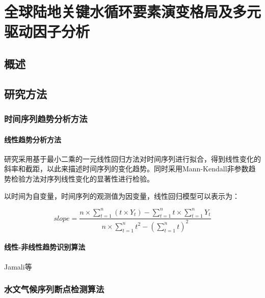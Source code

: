 \chapter{全球陆地关键水循环要素演变格局及多元驱动因子分析}
\label{chap:runoff_trend}

\section{概述}

\section{研究方法}

\subsection{时间序列趋势分析方法}

\subsubsection{线性趋势分析方法}

研究采用基于最小二乘的一元线性回归方法对时间序列进行拟合，得到线性变化的斜率和截距，以此来描述时间序列的变化趋势。同时采用Mann-Kendall非参数趋势检验方法对序列线性变化的显著性进行检验。\par
以时间为自变量，时间序列的观测值为因变量，线性回归模型可以表示为：

\begin{equation}
	slope=\frac{n\times\sum_{t=1}^n\left(t\times Y_t\right)-\sum_{t=1}^nt\times\sum_{t=1}^nY_t}{n\times\sum_{t=1}^nt^2-\left(\sum_{t=1}^nt\right)^2}
\end{equation}


\subsubsection{线性-非线性趋势识别算法}

Jamali等\cite{jamaliAutomatedMappingVegetation2014}

\subsection{水文气候序列断点检测算法}

